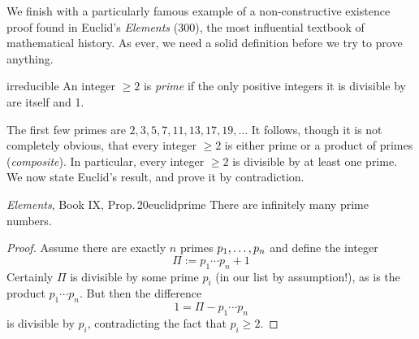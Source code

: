We finish with a particularly famous example of a non-constructive existence proof found in Euclid's \emph{Elements} (300\BCE), the most influential textbook of mathematical history. As ever, we need a solid definition before we try to prove anything.

\begin{defn}{}{irreducible}
	An integer $\ge 2$ is \emph{prime} if the only positive integers it is divisible by are itself and 1.
\end{defn}

 The first few primes are $2,3,5,7,11,13,17,19,\ldots$ It follows, though it is not completely obvious, that every integer $\ge 2$ is either prime or a product of primes (\emph{composite}). In particular, every integer $\ge 2$ is divisible by at least one prime. We now state Euclid's result, and prove it by contradiction.

\begin{thm}{\emph{Elements}, Book IX, Prop.\,20}{euclidprime}
	There are infinitely many prime numbers.
\end{thm}

\begin{proof}
	Assume there are exactly $n$ primes ${p}_1,\ldots,{p}_{n}$ and define the integer
	\[\Pi:=p_1\cdots p_n+1\]
	Certainly $\Pi$ is divisible by some prime $p_i$ (in our list by assumption!), as is the product $p_1\cdots p_n$. But then the difference
	\[
		1=\Pi-p_1\cdots p_n
	\]
	is divisible by $p_i$, contradicting the fact that $p_i\ge 2$.
\end{proof}


\goodbreak


